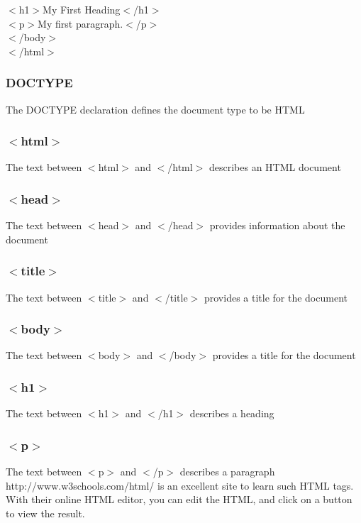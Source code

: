\documentclass[a4paper, 12pt]{article}
\begin{document}
$<$h1$>$My First Heading$<$/h1$>$ \\
$<$p$>$My first paragraph.$<$/p$>$ \\

$<$/body$>$ \\
$<$/html$>$ \\

\subsubsection{DOCTYPE}
The DOCTYPE declaration defines the document type to be HTML

\subsubsection{$<$html$>$}
The text between $<$html$>$ and $<$/html$>$ describes an HTML document

\subsubsection{$<$head$>$}
The text between $<$head$>$ and $<$/head$>$ provides information about the document

\subsubsection{$<$title$>$}
The text between $<$title$>$ and $<$/title$>$ provides a title for the document	
	
\subsubsection{$<$body$>$}
The text between $<$body$>$ and $<$/body$>$ provides a title for the document

\subsubsection{$<$h1$>$}
The text between $<$h1$>$ and $<$/h1$>$ describes a heading

\subsubsection{$<$p$>$}
The text between $<$p$>$ and $<$/p$>$ describes a paragraph \\

http://www.w3schools.com/html/ is an excellent site to learn such HTML tags. With their online HTML editor, you can edit the HTML, and click on a button to view the result.
\end{document}
